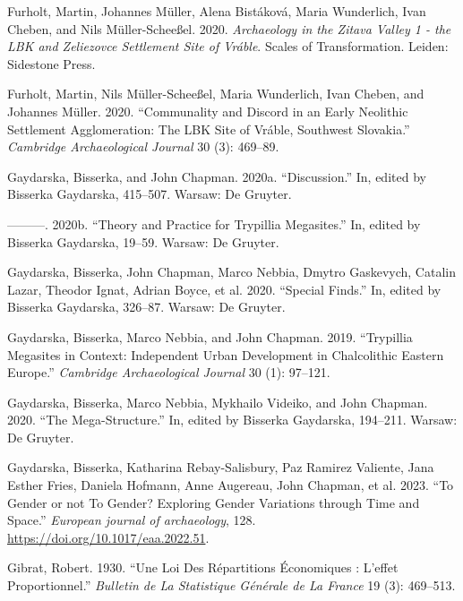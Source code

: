 \documentclass[
  12pt,
  a4paper, twoside]{book}
\newlength{\cslhangindent}
\newlength{\cslentryspacingunit} %
\newenvironment{CSLReferences}[2] %
 {%
  \setlength{\parindent}{0pt}
  \ifodd #1
  \let\oldpar\par
  \def\par{\hangindent=\cslhangindent\oldpar}
  \fi
  \setlength{\parskip}{#2\cslentryspacingunit}
 }%
 {}
\begin{document}
\begin{CSLReferences}{1}{0}
\leavevmode{}%
Furholt, Martin, Johannes Müller, Alena Bistáková, Maria Wunderlich, Ivan Cheben, and Nils Müller-Scheeßel. 2020. \emph{Archaeology in the Zitava Valley 1 - the LBK and Zeliezovce Settlement Site of Vráble}. Scales of Transformation. Leiden: Sidestone Press.

\leavevmode{}%
Furholt, Martin, Nils Müller-Scheeßel, Maria Wunderlich, Ivan Cheben, and Johannes Müller. 2020. {``Communality and Discord in an Early Neolithic Settlement Agglomeration: The LBK Site of Vráble, Southwest Slovakia.''} \emph{Cambridge Archaeological Journal} 30 (3): 469--89.

\leavevmode{}%
Gaydarska, Bisserka, and John Chapman. 2020a. {``Discussion.''} In, edited by Bisserka Gaydarska, 415--507. Warsaw: De Gruyter.

\leavevmode{}%
---------. 2020b. {``Theory and Practice for Trypillia Megasites.''} In, edited by Bisserka Gaydarska, 19--59. Warsaw: De Gruyter.

\leavevmode{}%
Gaydarska, Bisserka, John Chapman, Marco Nebbia, Dmytro Gaskevych, Catalin Lazar, Theodor Ignat, Adrian Boyce, et al. 2020. {``Special Finds.''} In, edited by Bisserka Gaydarska, 326--87. Warsaw: De Gruyter.

\leavevmode{}%
Gaydarska, Bisserka, Marco Nebbia, and John Chapman. 2019. {``Trypillia Megasites in Context: Independent Urban Development in Chalcolithic Eastern Europe.''} \emph{Cambridge Archaeological Journal} 30 (1): 97--121.

\leavevmode{}%
Gaydarska, Bisserka, Marco Nebbia, Mykhailo Videiko, and John Chapman. 2020. {``The Mega-Structure.''} In, edited by Bisserka Gaydarska, 194--211. Warsaw: De Gruyter.

\leavevmode{}%
Gaydarska, Bisserka, Katharina Rebay-Salisbury, Paz Ramirez Valiente, Jana Esther Fries, Daniela Hofmann, Anne Augereau, John Chapman, et al. 2023. {``To Gender or not To Gender? Exploring Gender Variations through Time and Space.''} \emph{European journal of archaeology}, 128. \url{https://doi.org/10.1017/eaa.2022.51}.

\leavevmode{}%
Gibrat, Robert. 1930. {``Une Loi Des Répartitions Économiques : L'effet Proportionnel.''} \emph{Bulletin de La Statistique Générale de La France} 19 (3): 469--513.


\end{CSLReferences}
\end{document}
